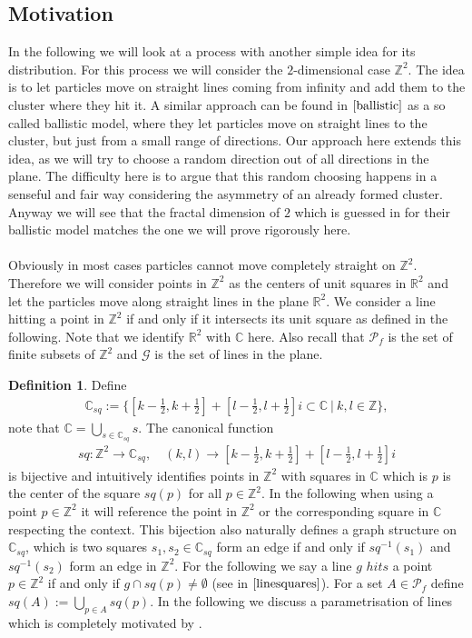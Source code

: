 \documentclass[12pt,a4paper]{scrartcl}
\newcommand{\C}{\mathbb{C}} %
\newcommand{\R}{\mathbb{R}} %
\newcommand{\Z}{\mathbb{Z}} %
\newcommand{\1}{\mathbbm{1}}
\newcommand{\G}{\mathcal{G}}
\newcommand{\mP}{\mathcal{P}}
\theoremstyle{definition}
\newtheorem{definition}{Definition}[subsection]
\numberwithin{equation}{section}
\begin{document}
\subsection{Motivation}

In the following we will look at a process with another simple idea for its distribution. For this process we will consider the $2$-dimensional case $\Z^2$. The idea is to let particles move on straight lines coming from infinity and add them to the cluster where they hit it. A similar approach can be found in $\cite{ballistic}$ as a so called ballistic model, where they let particles move on straight lines to the cluster, but just from a small range of directions. Our approach here extends this idea, as we will try to choose a random direction out of all directions in the plane. The difficulty here is to argue that this random choosing happens in a senseful and fair way considering the asymmetry of an already formed cluster. Anyway we will see that the fractal dimension of $2$ which is guessed in \cite{ballistic} for their ballistic model matches the one we will prove rigorously here. \\
\\Obviously in most cases particles cannot move completely straight on $\Z^2$. Therefore we will consider points in $\Z^2$ as the centers of unit squares in $\R^2$ and let the particles move along straight lines in the plane $\mathbb{R}^2$. We consider a line hitting a point in $\Z^2$ if and only if it intersects its unit square as defined in the following. Note that we identify $\R^2$ with $\C$ here. Also recall that $\mP_f$ is the set of finite subsets of $\Z^2$ and $\G$ is the set of lines in the plane. 

\begin{definition} \label{squares}
	Define 
	\begin{align}
		\C_{sq} := \{[k - \frac{1}{2}, k + \frac{1}{2}] + [l- \frac{1}{2}, l + \frac{1}{2}]i \subset \C\ |\ k,l \in \Z\}, 
	\end{align} 
	note that $\C = \bigcup_{s\in \C_{sq}} s$. The canonical function
	\begin{align}
	sq: \Z^2 \to \C_{sq},\quad (k,l)\to [k - \frac{1}{2}, k + \frac{1}{2}] + [l- \frac{1}{2}, l + \frac{1}{2}]i
	\end{align}
	is bijective and intuitively identifies points in $\Z^2$ with squares in $\C$ which is $p$ is the center of the square $sq(p)$ for all $p\in \Z^2$. In the following when using a point $p\in \Z^2$ it will reference the point in $\Z^2$ or the corresponding square in $\C$ respecting the context. This bijection also naturally defines a graph structure on $\C_{sq}$, which is two squares $s_1, s_2\in \C_{sq}$ form an edge if and only if $sq^{-1}(s_1)$ and $sq^{-1}(s_2)$ form an edge in $\Z^2$. 
	\noindent For the following we say a line $g$ $hits$ a point $p\in \Z^2$ if and only if $g\cap sq(p) \neq \emptyset$ (see in $\autoref{linesquares}$). For a set $A\in\mP_f$ define $sq(A) := \bigcup_{p\in A} sq(p)$. In the following we discuss a parametrisation of lines which is completely motivated by \cite[2.1.1]{sackmann}. 
\end{definition}
	
\end{document}
